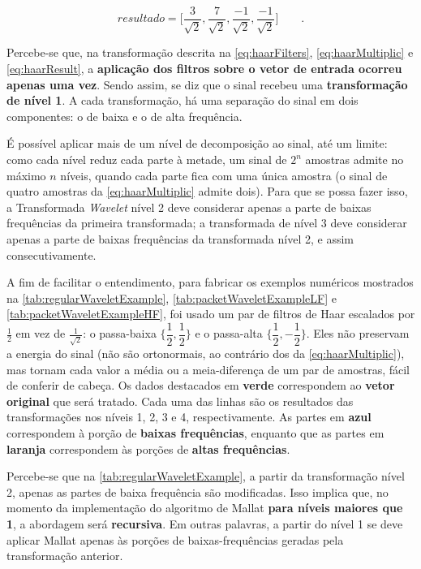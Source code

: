 			\begin{equation}
				resultado = \Big[
				\frac{3}{\sqrt{2}},
				\frac{7}{\sqrt{2}},
				\frac{-1}{\sqrt{2}},
				\frac{-1}{\sqrt{2}}
				\Big]\qquad.
				\label{eq:haarResult}
			\end{equation}
			
			\par Percebe-se que, na transformação descrita na \autoref{eq:haarFilters}, \autoref{eq:haarMultiplic} e \autoref{eq:haarResult}, a \textbf{aplicação dos filtros sobre o vetor de entrada ocorreu apenas uma vez}. Sendo assim, se diz que o sinal recebeu uma \textbf{transformação de nível 1}. A cada transformação, há uma separação do sinal em dois componentes: o de baixa e o de alta frequência.
	
			\par É possível aplicar mais de um nível de decomposição ao sinal, até um limite: como cada nível reduz cada parte à metade, um sinal de $2^n$ amostras admite no máximo $n$ níveis, quando cada parte fica com uma única amostra (o sinal de quatro amostras da \autoref{eq:haarMultiplic} admite dois). Para que se possa fazer isso, a Transformada \textit{Wavelet} nível 2 deve considerar apenas a parte de baixas frequências da primeira transformada; a transformada de nível 3 deve considerar apenas a parte de baixas frequências da transformada nível 2, e assim consecutivamente.
			
			\par A fim de facilitar o entendimento, para fabricar os exemplos numéricos mostrados na \autoref{tab:regularWaveletExample}, \autoref{tab:packetWaveletExampleLF} e \autoref{tab:packetWaveletExampleHF}, foi usado um par de filtros de Haar escalados por $\tfrac{1}{2}$ em vez de $\tfrac{1}{\sqrt{2}}$: o passa-baixa $\{\dfrac{1}{2},\dfrac{1}{2}\}$ e o passa-alta $\{\dfrac{1}{2},-\dfrac{1}{2}\}$. Eles não preservam a energia do sinal (não são ortonormais, ao contrário dos da \autoref{eq:haarMultiplic}), mas tornam cada valor a média ou a meia-diferença de um par de amostras, fácil de conferir de cabeça. Os dados destacados em \textbf{verde} correspondem ao \textbf{vetor original} que será tratado. Cada uma das linhas são os resultados das transformações nos níveis 1, 2, 3 e 4, respectivamente. As partes em \textbf{azul} correspondem à porção de \textbf{baixas frequências}, enquanto que as partes em \textbf{laranja} correspondem às porções de \textbf{altas frequências}.
			
			\par Percebe-se que na \autoref{tab:regularWaveletExample}, a partir da transformação nível 2, apenas as partes de baixa frequência são modificadas. Isso implica que, no momento da implementação do algoritmo de Mallat \textbf{para níveis maiores que 1}, a abordagem será \textbf{recursiva}. Em outras palavras, a partir do nível 1 se deve aplicar Mallat apenas às porções de baixas-frequências geradas pela transformação anterior.
	
